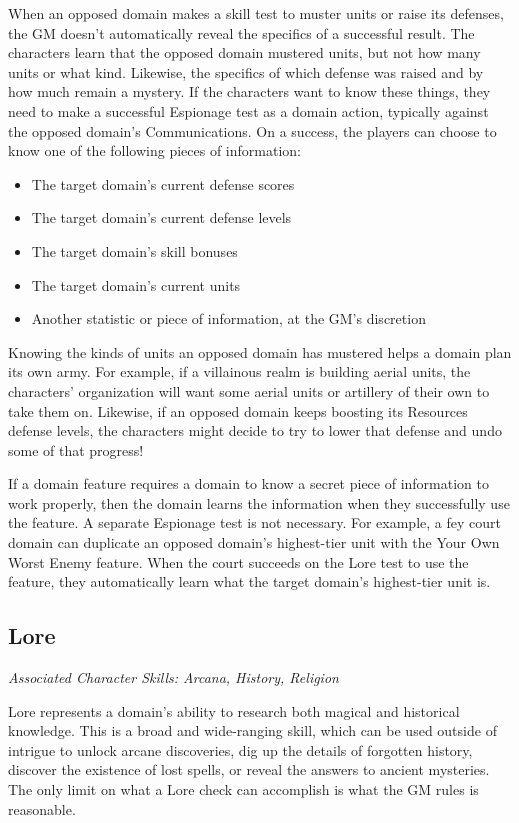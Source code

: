 \documentclass[10pt,a4paper,twoside,bg=print,twocolumn,openany,nodeprecatedcode]{dndbook}
\begin{document}
When an opposed domain makes a skill test to muster units or raise its defenses, the GM doesn't automatically reveal the specifics of a successful result. The characters learn that the opposed domain mustered units, but not how many units or what kind. Likewise, the specifics of which defense was raised and by how much remain a mystery. If the characters want to know these things, they need to make a successful Espionage test as a domain action, typically against the opposed domain's Communications. On a success, the players can choose to know one of the following pieces of information:


\begin{itemize}
\item The target domain's current defense scores
\item The target domain's current defense levels
\item The target domain's skill bonuses
\item The target domain's current units
\item Another statistic or piece of information, at the GM's discretion
\end{itemize}

Knowing the kinds of units an opposed domain has mustered helps a domain plan its own army. For example, if a villainous realm is building aerial units, the characters' organization will want some aerial units or artillery of their own to take them on. Likewise, if an opposed domain keeps boosting its Resources defense levels, the characters might decide to try to lower that defense and undo some of that progress!

If a domain feature requires a domain to know a secret piece of information to work properly, then the domain learns the information when they successfully use the feature. A separate Espionage test is not necessary. For example, a fey court domain can duplicate an opposed domain's highest-tier unit with the Your Own Worst Enemy feature. When the court succeeds on the Lore test to use the feature, they automatically learn what the target domain's highest-tier unit is.

\subsection{Lore}
\textit{Associated Character Skills: Arcana, History, Religion}

Lore represents a domain's ability to research both magical and historical knowledge. This is a broad and wide-ranging skill, which can be used outside of intrigue to unlock arcane discoveries, dig up the details of forgotten history, discover the existence of lost spells, or reveal the answers to ancient mysteries. The only limit on what a Lore check can accomplish is what the GM rules is reasonable.
\end{document}
